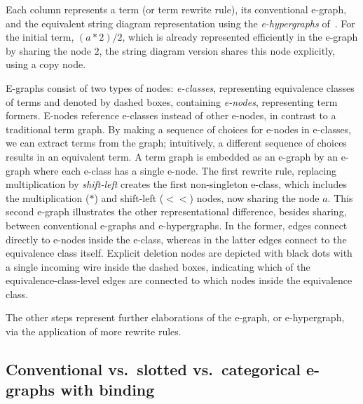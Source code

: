 Each column represents a term (or term rewrite rule), its conventional e-graph, and the equivalent string diagram representation using the \emph{e-hypergraphs} of~\citet{tiurin2025equivalencehypergraphsdporewriting}.
For the initial term, $(a*2)/2$, which is already represented efficiently in the e-graph by sharing the node $2$, the string diagram version shares this node explicitly, using a copy node.

E-graphs consist of two types of nodes: \emph{e-classes}, representing equivalence classes of terms and denoted by dashed boxes, containing \emph{e-nodes}, representing term formers.
E-nodes reference e-classes instead of other e-nodes, in contrast to a traditional term graph.
By making a sequence of choices for e-nodes in e-classes, we can extract terms from the graph; intuitively, a different sequence of choices results in an equivalent term.
A term graph is embedded as an e-graph by an e-graph where each e-class has a single e-node.
The first rewrite rule, replacing multiplication by \emph{shift-left} creates the first non-singleton e-class, which includes the multiplication ($*$) and shift-left ($<\!\!<$) nodes, now sharing the node $a$.
This second e-graph illustrates the other representational difference, besides sharing, between conventional e-graphs and e-hypergraphs.
In the former, edges connect directly to e-nodes inside the e-class, whereas in the latter edges connect to the equivalence class itself.
Explicit deletion nodes are depicted with black dots with a single incoming wire
inside the dashed boxes, indicating which of the equivalence-class-level edges are connected to which nodes inside the equivalence class.

The other steps represent further elaborations of the e-graph, or e-hypergraph, via the application of more rewrite rules.

\subsection{Conventional vs.\ slotted vs.\ categorical e-graphs with binding}%
\label{sec:vs-e-graphs-with-binding}

